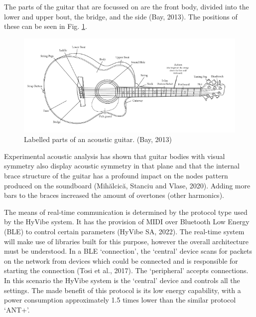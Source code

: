 \documentclass[conference]{IEEEtran}
\begin{document}
The parts of the guitar that are focussed on are the front body, divided into the lower and upper bout, the bridge, and the side (Bay, 2013). The positions of these can be seen in Fig. \ref{guitar}.

\begin{figure}[htbp]
    \centerline{\includegraphics[scale=0.4]{guitar.png}}
    \caption{Labelled parts of an acoustic guitar. (Bay, 2013)}
    \label{guitar}
    \end{figure}


Experimental acoustic analysis has shown that guitar bodies with visual symmetry also display acoustic symmetry in that plane and that the internal brace structure of the guitar has a profound impact on the nodes pattern produced on the soundboard (Mihălcică, Stanciu and Vlase, 2020).
Adding more bars to the braces increased the amount of overtones (other harmonics). 

The means of real-time communication is determined by the protocol type used by the HyVibe system. It has the provision of MIDI over Bluetooth Low Energy (BLE) to control certain parameters (HyVibe SA, 2022). The real-time system will
make use of libraries built for this purpose, however the overall architecture must be understood. In a BLE `connection', the `central' device scans for packets on the network from devices which could be connected and 
is responsible for starting the connection (Tosi et al., 2017). The `peripheral' accepts connections. In this scenario the HyVibe system is the `central' device and controls all the settings. The made benefit of this protocol is
its low energy capability, with a power consumption approximately 1.5 times lower than the similar protocol `ANT+'. 
\end{document}

